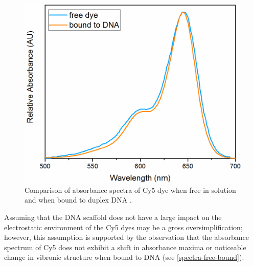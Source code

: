 \begin{figure}[h!]
  \centering
  \includegraphics[width=0.8\linewidth]{figures/pub1/free-vs-bound-cy5.pdf}
  \caption[Comparison of absorbance spectra of Cy5 dye when free in solution and when bound to duplex DNA.]{Comparison of absorbance spectra of Cy5 dye when free in solution and when bound to duplex DNA \cite{Cannon2017, thermofisher}.}\label{spectra-free-bound}
\end{figure}

Assuming that the DNA scaffold does not have a large impact on the electrostatic environment of the Cy5 dyes may be a gross oversimplification; however, this assumption is supported by the observation that the absorbance spectrum of Cy5 does not exhibit a shift in absorbance maxima or noticeable change in vibronic structure when bound to DNA (see \autoref{spectra-free-bound}).


